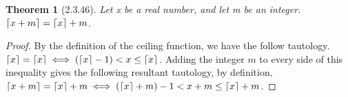 \documentclass[a4paper, 12pt]{article}
\theoremstyle{plain}
\newtheorem*{theorem*}{Theorem}
\DeclarePairedDelimiter{\ceil}{\lceil}{\rceil}
\begin{document}
	
	\begin{theorem*}[2.3.46]
		Let x be a real number, and let m be an integer. \newline $\ceil{x + m} = \ceil{x} + m$.
	\end{theorem*}
	
	\begin{proof}
		By the definition of the ceiling function, we have the follow tautology.
		$\ceil{x} = \ceil{x} \iff (\ceil{x} - 1) < x \le \ceil{x}$. \newline Adding the integer 
		$m$ to every side of this inequality gives the following resultant tautology, by 
		definition, \newline
		$\ceil{x + m} = \ceil{x} + m \iff (\ceil{x} + m) - 1 < x + m \le \ceil{x} + m$.
	\end{proof}
\end{document}
